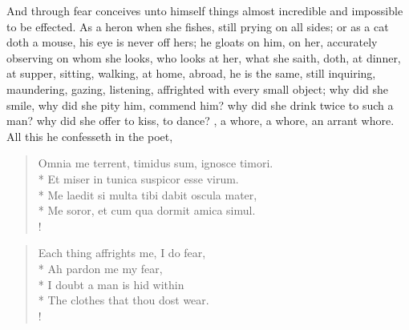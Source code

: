 And through fear conceives unto himself things almost incredible and
impossible to be effected. As a heron when she fishes, still prying on
all sides; or as a cat doth a mouse, his eye is never off hers; he
gloats on him, on her, accurately observing on whom she looks, who
looks at her, what she saith, doth, at dinner, at supper, sitting,
walking, at home, abroad, he is the same, still inquiring, maundering,
gazing, listening, affrighted with every small object; why did she
smile, why did she pity him, commend him? why did she drink twice to
such a man? why did she offer to kiss, to dance? \etc{}, a whore, a whore,
an arrant whore. All this he confesseth in the poet, %
%
\begin{latin}
\begin{verse}%
Omnia me terrent, timidus sum, ignosce timori.\\*
Et miser in tunica suspicor esse virum.\\*
Me laedit si multa tibi dabit oscula mater,\\*
Me soror, et cum qua dormit amica simul.\\!
\end{verse}%
\end{latin}
\translationrule%
\begin{verse}%
Each thing affrights me, I do fear,\\*
Ah pardon me my fear,\\*
I doubt a man is hid within\\*
The clothes that thou dost wear.\\!
\end{verse}%

